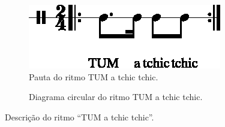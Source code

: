 \begin{figure}[H]
\centering
     \begin{subfigure}[c]{0.45\textwidth}
         \centering
         \includegraphics[width=\textwidth]{chapters/cap-musicalidade-percepcion/treino-ritmo3-1.eps}
         \caption{Pauta do ritmo TUM a tchic tchic.}
         \label{fig:RitmoTUMatchictchic1}
     \end{subfigure}
     \hfill
     \begin{subfigure}[c]{0.45\textwidth}
         \centering
{}
         \caption{Diagrama circular do ritmo TUM a tchic tchic.}
         \label{fig:RitmoTUMatchictchic2}
     \end{subfigure}
\caption{Descrição do ritmo ``TUM a tchic tchic''.}
\label{fig:abc-percepcionritmica3}
\end{figure}



